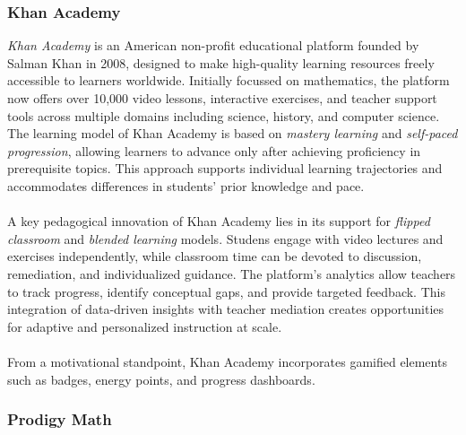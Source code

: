 \subsubsection{Khan Academy}
\textit{Khan Academy} is an American non-profit educational platform founded by Salman Khan in 2008, designed to make high-quality learning resources freely accessible to learners worldwide. Initially focussed on mathematics, the platform now offers over 10,000 video lessons, interactive exercises, and teacher support tools across multiple domains including science, history, and computer science. The learning model of Khan Academy is based on \textit{mastery learning} and \textit{self-paced progression}, allowing learners to advance only after achieving proficiency in prerequisite topics. This approach supports individual learning trajectories and accommodates differences in students' prior knowledge and pace.\\ \\
A key pedagogical innovation of Khan Academy lies in its support for \textit{flipped classroom} and \textit{blended learning} models. Studens engage with video lectures and exercises independently, while classroom time can be devoted to discussion, remediation, and individualized guidance. The platform's analytics allow teachers to track progress, identify conceptual gaps, and provide targeted feedback. This integration of data-driven insights with teacher mediation creates opportunities for adaptive and personalized instruction at scale.\\ \\
From a motivational standpoint, Khan Academy incorporates gamified elements such as badges, energy points, and progress dashboards.
\subsubsection{Prodigy Math}

